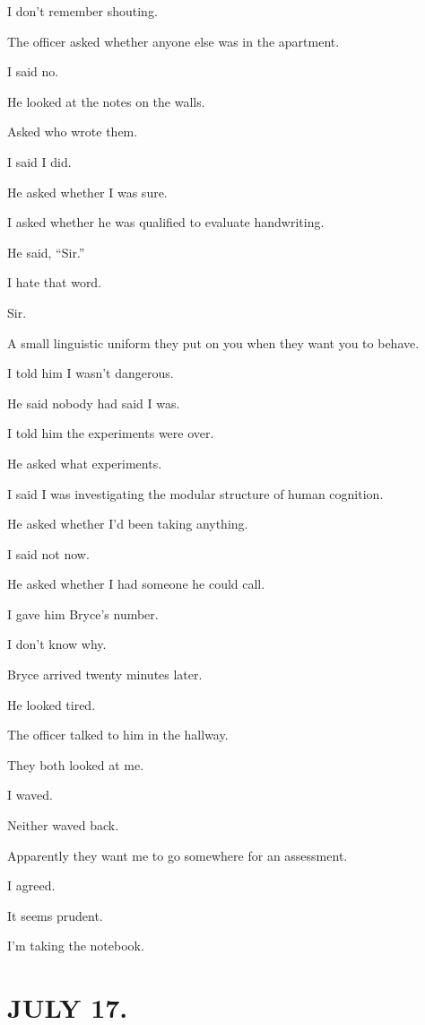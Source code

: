 \documentclass[11pt,oneside]{book}
\begin{document}
I don't remember shouting.

The officer asked whether anyone else was in the apartment.

I said no.

He looked at the notes on the walls.

Asked who wrote them.

I said I did.

He asked whether I was sure.

I asked whether he was qualified to evaluate handwriting.

He said, ``Sir.''

I hate that word.

Sir.

A small linguistic uniform they put on you when they want you to behave.

I told him I wasn't dangerous.

He said nobody had said I was.

I told him the experiments were over.

He asked what experiments.

I said I was investigating the modular structure of human cognition.

He asked whether I'd been taking anything.

I said not now.

He asked whether I had someone he could call.

I gave him Bryce's number.

I don't know why.

Bryce arrived twenty minutes later.

He looked tired.

The officer talked to him in the hallway.

They both looked at me.

I waved.

Neither waved back.

Apparently they want me to go somewhere for an assessment.

I agreed.

It seems prudent.

I'm taking the notebook.

\section*{JULY 17.}
\end{document}
